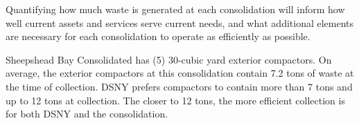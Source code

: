 
    Quantifying how much waste is generated at each consolidation will inform how well current assets and services serve current needs, and what additional elements are necessary for each consolidation to operate as efficiently as possible.
    
    Sheepshead Bay Consolidated has (5) 30-cubic yard exterior compactors. On average, the exterior compactors at this consolidation contain 7.2 tons of waste at the time of collection. DSNY prefers compactors to contain more than 7 tons and up to 12 tons at collection. The closer to 12 tons, the more efficient collection is for both DSNY and the consolidation.